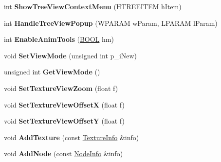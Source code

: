 \begin{DoxyCompactItemize}
\item 
\hypertarget{class_c_display_afb7a5ccdca0c68bc53eb1039f2b77810}{int {\bfseries Show\+Tree\+View\+Context\+Menu} (H\+T\+R\+E\+E\+I\+T\+E\+M h\+Item)}\label{class_c_display_afb7a5ccdca0c68bc53eb1039f2b77810}

\item 
\hypertarget{class_c_display_a9420e620c397a360c73664d16ff22349}{int {\bfseries Handle\+Tree\+View\+Popup} (W\+P\+A\+R\+A\+M w\+Param, L\+P\+A\+R\+A\+M l\+Param)}\label{class_c_display_a9420e620c397a360c73664d16ff22349}

\item 
\hypertarget{class_c_display_a52819490027e8e6d3d13a394738fb74f}{int {\bfseries Enable\+Anim\+Tools} (\hyperlink{_ice_types_8h_a050c65e107f0c828f856a231f4b4e788}{B\+O\+O\+L} hm)}\label{class_c_display_a52819490027e8e6d3d13a394738fb74f}

\item 
\hypertarget{class_c_display_a449b2f60f7087735cd69d36c512f7445}{void {\bfseries Set\+View\+Mode} (unsigned int p\+\_\+i\+New)}\label{class_c_display_a449b2f60f7087735cd69d36c512f7445}

\item 
\hypertarget{class_c_display_aef9db4eed6f5d1096c1168bff562a6f4}{unsigned int {\bfseries Get\+View\+Mode} ()}\label{class_c_display_aef9db4eed6f5d1096c1168bff562a6f4}

\item 
\hypertarget{class_c_display_afff69a313196de972e95900b53f9859c}{void {\bfseries Set\+Texture\+View\+Zoom} (float f)}\label{class_c_display_afff69a313196de972e95900b53f9859c}

\item 
\hypertarget{class_c_display_a05cb6684b8d7cebeeb8cc19cc45d592c}{void {\bfseries Set\+Texture\+View\+Offset\+X} (float f)}\label{class_c_display_a05cb6684b8d7cebeeb8cc19cc45d592c}

\item 
\hypertarget{class_c_display_ac514caf6021a100ed98922951697e308}{void {\bfseries Set\+Texture\+View\+Offset\+Y} (float f)}\label{class_c_display_ac514caf6021a100ed98922951697e308}

\item 
\hypertarget{class_c_display_ad9312d022967f238bbbce1cf16d0b666}{void {\bfseries Add\+Texture} (const \hyperlink{struct_c_display_1_1_texture_info}{Texture\+Info} \&info)}\label{class_c_display_ad9312d022967f238bbbce1cf16d0b666}

\item 
\hypertarget{class_c_display_a45e1b382f84f9a26a0953147eebc833b}{void {\bfseries Add\+Node} (const \hyperlink{struct_c_display_1_1_node_info}{Node\+Info} \&info)}\label{class_c_display_a45e1b382f84f9a26a0953147eebc833b}


\end{DoxyCompactItemize}
